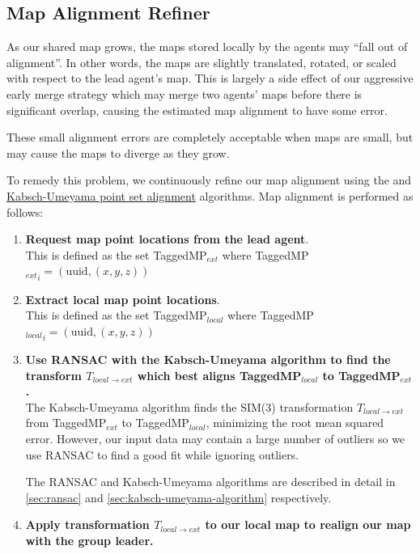 \subsection{Map Alignment Refiner}
\label{sec:map-alignment-refiner}
As our shared map grows, the maps stored locally by the agents may ``fall out of alignment''. In other words, the maps are slightly translated, rotated, or scaled with respect to the lead agent's map. This is largely a side effect of our aggressive early merge strategy which may merge two agents' maps before there is significant overlap, causing the estimated map alignment to have some error.

These small alignment errors are completely acceptable when maps are small, but may cause the maps to diverge as they grow.

To remedy this problem, we continuously refine our map alignment using the  and \hyperref[sec:kabsch-umeyama-algorithm]{Kabsch-Umeyama point set alignment} algorithms. Map alignment is performed as follows:

\begin{enumerate}
    \item \textbf{Request map point locations from the lead agent}. \\
          This is defined as the set TaggedMP$_{ext}$ where TaggedMP${_{ext}}_i = (\text{uuid}, (x, y, z))$
    \item \textbf{Extract local map point locations}. \\
          This is defined as the set TaggedMP$_{local}$ where TaggedMP${_{local}}_i = (\text{uuid}, (x, y, z))$
    \item \textbf{Use RANSAC with the Kabsch-Umeyama algorithm to find the transform $T_{local \to ext}$ which best aligns TaggedMP$_{local}$ to TaggedMP$_{ext}$.} \\
          The Kabsch-Umeyama algorithm finds the SIM(3) transformation $T_{local \to ext}$ from TaggedMP$_{ext}$ to TaggedMP$_{local}$, minimizing the root mean squared error. However, our input data may contain a large number of outliers so we use RANSAC to find a good fit while ignoring outliers.

          The RANSAC and Kabsch-Umeyama algorithms are described in detail in \autoref{sec:ransac} and \autoref{sec:kabsch-umeyama-algorithm} respectively.
    \item \textbf{Apply transformation $T_{local \to ext}$ to our local map to realign our map with the group leader.}
\end{enumerate}

